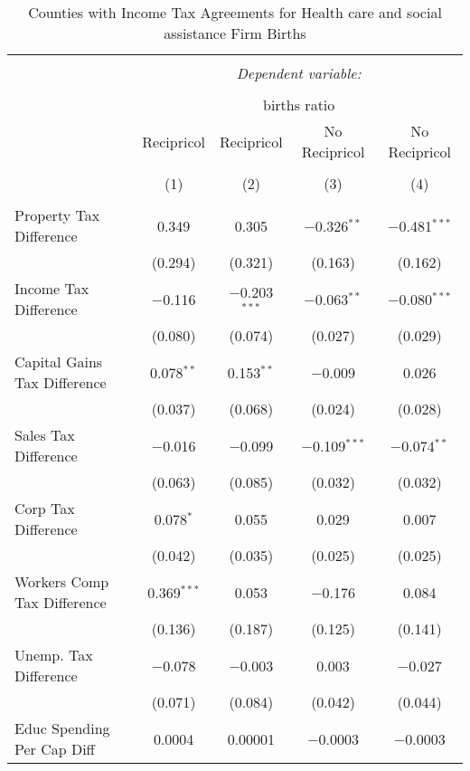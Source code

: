 
\begin{table}[!htbp] \centering 
  \caption{Counties with Income Tax Agreements for  Health care and social assistance Firm Births} 
  \label{62agreement} 
\begin{tabular}{@{\extracolsep{5pt}}lcccc} 
\\[-1.8ex]\hline 
\hline \\[-1.8ex] 
 & \multicolumn{4}{c}{\textit{Dependent variable:}} \\ 
\cline{2-5} 
\\[-1.8ex] & \multicolumn{4}{c}{births ratio} \\ 
 & Recipricol & Recipricol & No Recipricol & No Recipricol \\ 
\\[-1.8ex] & (1) & (2) & (3) & (4)\\ 
\hline \\[-1.8ex] 
 Property Tax Difference & 0.349 & 0.305 & $-$0.326$^{**}$ & $-$0.481$^{***}$ \\ 
  & (0.294) & (0.321) & (0.163) & (0.162) \\ 
  Income Tax Difference & $-$0.116 & $-$0.203$^{***}$ & $-$0.063$^{**}$ & $-$0.080$^{***}$ \\ 
  & (0.080) & (0.074) & (0.027) & (0.029) \\ 
  Capital Gains Tax Difference & 0.078$^{**}$ & 0.153$^{**}$ & $-$0.009 & 0.026 \\ 
  & (0.037) & (0.068) & (0.024) & (0.028) \\ 
  Sales Tax Difference & $-$0.016 & $-$0.099 & $-$0.109$^{***}$ & $-$0.074$^{**}$ \\ 
  & (0.063) & (0.085) & (0.032) & (0.032) \\ 
  Corp Tax Difference & 0.078$^{*}$ & 0.055 & 0.029 & 0.007 \\ 
  & (0.042) & (0.035) & (0.025) & (0.025) \\ 
  Workers Comp Tax Difference & 0.369$^{***}$ & 0.053 & $-$0.176 & 0.084 \\ 
  & (0.136) & (0.187) & (0.125) & (0.141) \\ 
  Unemp. Tax Difference & $-$0.078 & $-$0.003 & 0.003 & $-$0.027 \\ 
  & (0.071) & (0.084) & (0.042) & (0.044) \\ 
  Educ Spending Per Cap Diff & 0.0004 & 0.00001 & $-$0.0003 & $-$0.0003 \\ 

\end{tabular}
\end{table}
